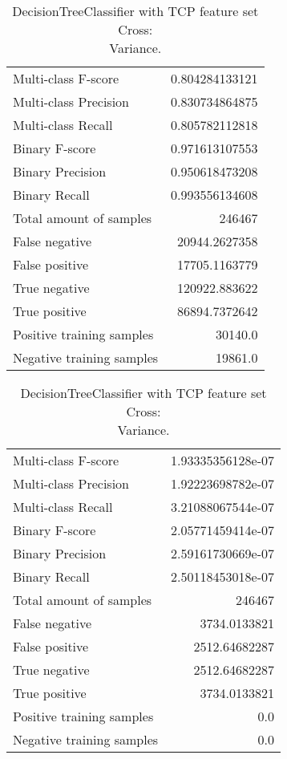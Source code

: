 \begin{table}[H]
\begin{minipage}{0.5\textwidth}
\caption{DecisionTreeClassifier with TCP feature set Cross: \\Average.}
\centering
\begin{tabular}{l r}
\toprule
Multi-class F-score & 0.804284133121 \\
Multi-class Precision & 0.830734864875 \\
Multi-class Recall & 0.805782112818 \\
\midrule
Binary F-score & 0.971613107553 \\
Binary Precision & 0.950618473208 \\
Binary Recall & 0.993556134608 \\
\midrule
Total amount of samples & 246467 \\
False negative & 20944.2627358 \\
False positive & 17705.1163779 \\
True negative & 120922.883622 \\
True positive & 86894.7372642 \\
\midrule
Positive training samples & 30140.0 \\
Negative training samples & 19861.0 \\
\bottomrule
\end{tabular}
\end{minipage}
\hfillx
\begin{minipage}{0.5\textwidth}
\caption{DecisionTreeClassifier with TCP feature set Cross: \\Variance.}
\centering
\begin{tabular}{l r}
\toprule
Multi-class F-score & 1.93335356128e-07 \\
Multi-class Precision & 1.92223698782e-07 \\
Multi-class Recall & 3.21088067544e-07 \\
\midrule
Binary F-score & 2.05771459414e-07 \\
Binary Precision & 2.59161730669e-07 \\
Binary Recall & 2.50118453018e-07 \\
\midrule
Total amount of samples & 246467 \\
False negative & 3734.0133821 \\
False positive & 2512.64682287 \\
True negative & 2512.64682287 \\
True positive & 3734.0133821 \\
\midrule
Positive training samples & 0.0 \\
Negative training samples & 0.0 \\
\bottomrule
\end{tabular}
\end{minipage}
\end{table}


